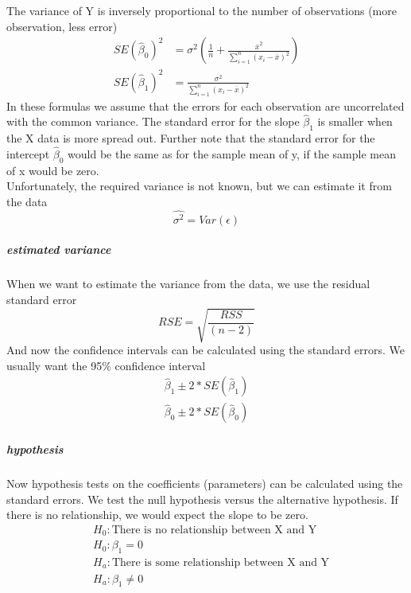 \documentclass[../document.tex]{subfiles}
\begin{document}
	The variance of Y is inversely proportional to the number of observations (more observation, less error)
	\begin{equation}
	\begin{split}
		SE(\hat{\beta}_{0})^2&=\sigma^2(\frac{1}{n}+\frac{\overline{x}^2}{\sum_{i=1}^{n}(x_{i}-\overline{x})^2})\\
		SE(\hat{\beta}_{1})^2&=\frac{\sigma^2}{\sum_{i=1}^{n}(x_{i}-\overline{x})^2}
	\end{split}
	\end{equation}
	In these formulas we assume that the errors for each observation are uncorrelated with the common variance. The standard error for the slope \(\hat{\beta}_{1}\) is smaller when the X data is more spread out. Further note that the standard error for the intercept \(\hat{\beta}_{0}\) would be the same as for the sample mean of y, if the sample mean of x would be zero.\\
	Unfortunately, the required variance is not known, but we can estimate it from the data
	\begin{equation}
		\hat{\sigma^2} = Var(\epsilon)
	\end{equation}
	\subparagraph{estimated variance}
	When we want to estimate the variance from the data, we use the residual standard error
	\begin{equation}
		RSE = \sqrt{\frac{RSS}{(n-2)}}
	\end{equation}
	And now the confidence intervals can be calculated using the standard errors. We usually want the 95\% confidence interval
	\begin{equation}
	\begin{split}
		\hat{\beta}_{1}\pm 2*SE(\hat{\beta}_{1})\\
		\hat{\beta}_{0}\pm 2*SE(\hat{\beta}_{0})
	\end{split}
	\end{equation}
	\subparagraph{hypothesis}
	Now hypothesis tests on the coefficients (parameters) can be calculated using the standard errors. We test the null hypothesis versus the alternative hypothesis. If there is no relationship, we would expect the slope to be zero.
	\begin{equation}
	\begin{split}
		&H_{0}: \text{There is no relationship between X and Y}\\
		&H_{0}: \beta_{1}=0\\
		&H_{a}: \text{There is some relationship between X and Y}\\
		&H_{a}: \beta_{1} \ne 0
	\end{split}
	\end{equation}
\end{document}
